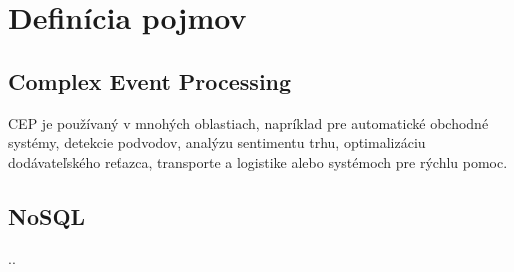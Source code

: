 \chapter{Definícia pojmov}


\section{Complex Event Processing}
\ac{CEP} je používaný v mnohých oblastiach, napríklad pre automatické obchodné systémy, detekcie podvodov, analýzu sentimentu trhu, optimalizáciu dodávateľského reťazca, transporte a logistike alebo systémoch pre rýchlu pomoc.

\section{NoSQL}
..
